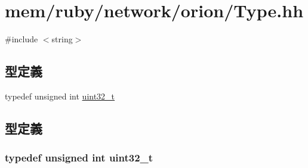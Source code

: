 \hypertarget{Type_8hh}{
\section{mem/ruby/network/orion/Type.hh}
\label{Type_8hh}
}
{\ttfamily \#include $<$string$>$}\par
\subsection*{型定義}
\begin{DoxyCompactItemize}
\item 
typedef unsigned int \hyperlink{Type_8hh_a435d1572bf3f880d55459d9805097f62}{uint32\_\-t}
\end{DoxyCompactItemize}


\subsection{型定義}
\hypertarget{Type_8hh_a435d1572bf3f880d55459d9805097f62}{
\subsubsection[{uint32\_\-t}]{\setlength{\rightskip}{0pt plus 5cm}typedef unsigned int {\bf uint32\_\-t}}}
\label{Type_8hh_a435d1572bf3f880d55459d9805097f62}
